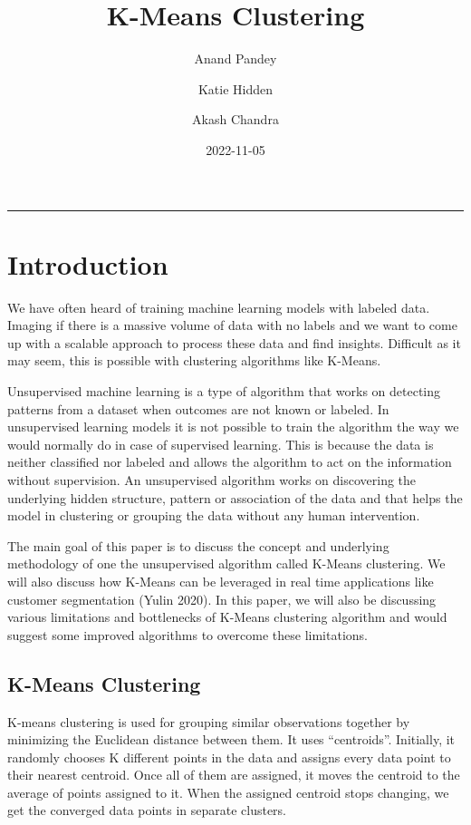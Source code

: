 \documentclass[
]{article}
\title{K-Means Clustering}
\author{Anand Pandey \and Katie Hidden \and Akash Chandra}
\date{2022-11-05}
\begin{document}
\maketitle

\begin{center}\rule{0.5\linewidth}{0.5pt}\end{center}

\hypertarget{introduction}{%
\section{Introduction}\label{introduction}}

We have often heard of training machine learning models with labeled
data. Imaging if there is a massive volume of data with no labels and we
want to come up with a scalable approach to process these data and find
insights. Difficult as it may seem, this is possible with clustering
algorithms like K-Means.

Unsupervised machine learning is a type of algorithm that works on
detecting patterns from a dataset when outcomes are not known or
labeled. In unsupervised learning models it is not possible to train the
algorithm the way we would normally do in case of supervised learning.
This is because the data is neither classified nor labeled and allows
the algorithm to act on the information without supervision. An
unsupervised algorithm works on discovering the underlying hidden
structure, pattern or association of the data and that helps the model
in clustering or grouping the data without any human intervention.

The main goal of this paper is to discuss the concept and underlying
methodology of one the unsupervised algorithm called K-Means clustering.
We will also discuss how K-Means can be leveraged in real time
applications like customer segmentation (Yulin 2020). In this paper, we
will also be discussing various limitations and bottlenecks of K-Means
clustering algorithm and would suggest some improved algorithms to
overcome these limitations.

\hypertarget{k-means-clustering}{%
\subsection{K-Means Clustering}\label{k-means-clustering}}

K-means clustering is used for grouping similar observations together by
minimizing the Euclidean distance between them. It uses ``centroids''.
Initially, it randomly chooses K different points in the data and
assigns every data point to their nearest centroid. Once all of them are
assigned, it moves the centroid to the average of points assigned to it.
When the assigned centroid stops changing, we get the converged data
points in separate clusters.
\end{document}
